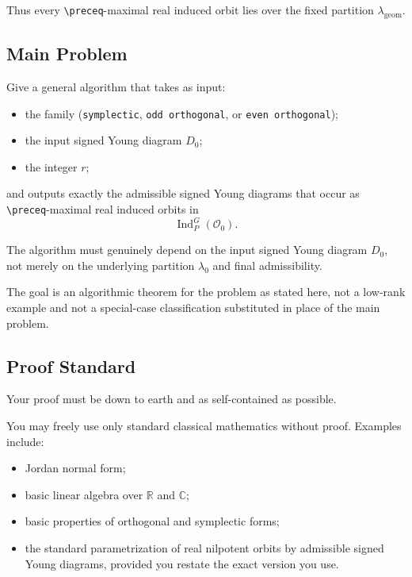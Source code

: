 \documentclass[
]{article}
\providecommand{\tightlist}{%
  \setlength{\itemsep}{0pt}\setlength{\parskip}{0pt}}
\begin{document}
Thus every \texttt{\textbackslash{}preceq}-maximal real induced orbit
lies over the fixed partition \(\lambda_{\mathrm{geom}}\).

\subsection{Main Problem}\label{main-problem}

Give a general algorithm that takes as input:

\begin{itemize}
\tightlist
\item
  the family (\texttt{symplectic}, \texttt{odd\ orthogonal}, or
  \texttt{even\ orthogonal});
\item
  the input signed Young diagram \(D_0\);
\item
  the integer \(r\);
\end{itemize}

and outputs exactly the admissible signed Young diagrams that occur as
\texttt{\textbackslash{}preceq}-maximal real induced orbits in \[
\operatorname{Ind}_P^G(\mathcal O_0).
\]

The algorithm must genuinely depend on the input signed Young diagram
\(D_0\), not merely on the underlying partition \(\lambda_0\) and final
admissibility.

The goal is an algorithmic theorem for the problem as stated here, not a
low-rank example and not a special-case classification substituted in
place of the main problem.

\subsection{Proof Standard}\label{proof-standard}

Your proof must be down to earth and as self-contained as possible.

You may freely use only standard classical mathematics without proof.
Examples include:

\begin{itemize}
\tightlist
\item
  Jordan normal form;
\item
  basic linear algebra over \(\mathbb R\) and \(\mathbb C\);
\item
  basic properties of orthogonal and symplectic forms;
\item
  the standard parametrization of real nilpotent orbits by admissible
  signed Young diagrams, provided you restate the exact version you use.
\end{itemize}
\end{document}
